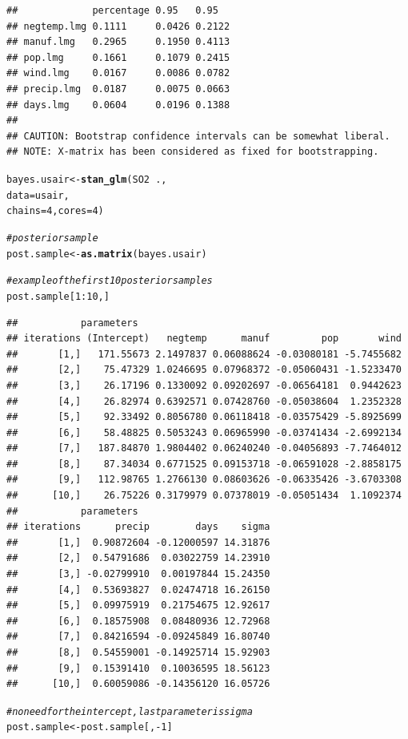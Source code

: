 \documentclass[11pt,a4paper,twoside]{book}\usepackage[]{graphicx}\usepackage[]{color}
\makeatletter
\newcommand{\hlnum}[1]{\textcolor[rgb]{0.686,0.059,0.569}{#1}}%
\newcommand{\hlcom}[1]{\textcolor[rgb]{0.678,0.584,0.686}{\textit{#1}}}%
\newcommand{\hlopt}[1]{\textcolor[rgb]{0,0,0}{#1}}%
\newcommand{\hlstd}[1]{\textcolor[rgb]{0.345,0.345,0.345}{#1}}%
\newcommand{\hlkwb}[1]{\textcolor[rgb]{0.69,0.353,0.396}{#1}}%
\newcommand{\hlkwc}[1]{\textcolor[rgb]{0.333,0.667,0.333}{#1}}%
\newcommand{\hlkwd}[1]{\textcolor[rgb]{0.737,0.353,0.396}{\textbf{#1}}}%
\newenvironment{kframe}{%
 \def\at@end@of@kframe{}%
 \ifinner\ifhmode%
  \def\at@end@of@kframe{\end{minipage}}%
  \begin{minipage}{\columnwidth}%
 \fi\fi%
 \def\FrameCommand##1{\hskip\@totalleftmargin \hskip-\fboxsep
 \colorbox{shadecolor}{##1}\hskip-\fboxsep
     \hskip-\linewidth \hskip-\@totalleftmargin \hskip\columnwidth}%
 \MakeFramed {\advance\hsize-\width
   \@totalleftmargin\z@ \linewidth\hsize
   \@setminipage}}%
 {\par\unskip\endMakeFramed%
 \at@end@of@kframe}
\newenvironment{knitrout}{}{} %
\makeatother
\begin{document}
\begin{knitrout}
\begin{kframe}
\begin{verbatim}
##             percentage 0.95   0.95  
## negtemp.lmg 0.1111     0.0426 0.2122
## manuf.lmg   0.2965     0.1950 0.4113
## pop.lmg     0.1661     0.1079 0.2415
## wind.lmg    0.0167     0.0086 0.0782
## precip.lmg  0.0187     0.0075 0.0663
## days.lmg    0.0604     0.0196 0.1388
## 
## CAUTION: Bootstrap confidence intervals can be somewhat liberal. 
## NOTE: X-matrix has been considered as fixed for bootstrapping.
\end{verbatim}
\begin{alltt}
\hlstd{bayes.usair} \hlkwb{<-} \hlkwd{stan_glm}\hlstd{(SO2} \hlopt{~} \hlstd{. ,}
                  \hlkwc{data} \hlstd{= usair,}
                  \hlkwc{chains} \hlstd{=} \hlnum{4}\hlstd{,} \hlkwc{cores} \hlstd{=} \hlnum{4}\hlstd{)}

\hlcom{#posterior sample}
\hlstd{post.sample} \hlkwb{<-} \hlkwd{as.matrix}\hlstd{(bayes.usair)}

\hlcom{#example of the first 10 posterior samples}
\hlstd{post.sample[}\hlnum{1}\hlopt{:}\hlnum{10}\hlstd{,]}
\end{alltt}
\begin{verbatim}
##           parameters
## iterations (Intercept)   negtemp      manuf         pop       wind
##       [1,]   171.55673 2.1497837 0.06088624 -0.03080181 -5.7455682
##       [2,]    75.47329 1.0246695 0.07968372 -0.05060431 -1.5233470
##       [3,]    26.17196 0.1330092 0.09202697 -0.06564181  0.9442623
##       [4,]    26.82974 0.6392571 0.07428760 -0.05038604  1.2352328
##       [5,]    92.33492 0.8056780 0.06118418 -0.03575429 -5.8925699
##       [6,]    58.48825 0.5053243 0.06965990 -0.03741434 -2.6992134
##       [7,]   187.84870 1.9804402 0.06240240 -0.04056893 -7.7464012
##       [8,]    87.34034 0.6771525 0.09153718 -0.06591028 -2.8858175
##       [9,]   112.98765 1.2766130 0.08603626 -0.06335426 -3.6703308
##      [10,]    26.75226 0.3179979 0.07378019 -0.05051434  1.1092374
##           parameters
## iterations      precip        days    sigma
##       [1,]  0.90872604 -0.12000597 14.31876
##       [2,]  0.54791686  0.03022759 14.23910
##       [3,] -0.02799910  0.00197844 15.24350
##       [4,]  0.53693827  0.02474718 16.26150
##       [5,]  0.09975919  0.21754675 12.92617
##       [6,]  0.18575908  0.08480936 12.72968
##       [7,]  0.84216594 -0.09245849 16.80740
##       [8,]  0.54559001 -0.14925714 15.92903
##       [9,]  0.15391410  0.10036595 18.56123
##      [10,]  0.60059086 -0.14356120 16.05726
\end{verbatim}
\begin{alltt}
\hlcom{#no need for the intercept, last parameter is sigma}
\hlstd{post.sample} \hlkwb{<-} \hlstd{post.sample[,}\hlopt{-}\hlnum{1}\hlstd{]}


\end{alltt}
\end{kframe}
\end{knitrout}
\end{document}
